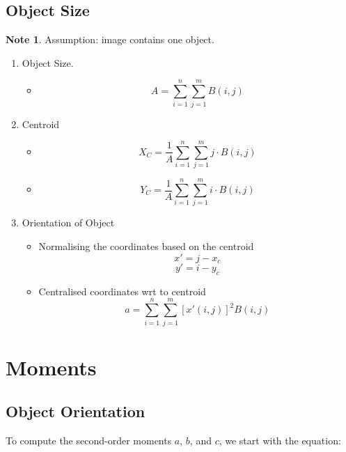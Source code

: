 \documentclass[11pt]{article}
\theoremstyle{definition}
\newtheorem*{unnote}{Note}  %
\begin{document}
\subsection{Object Size}
\begin{unnote}
    Assumption: image contains one object.
\end{unnote}
\begin{enumerate}
    \item Object Size.
    \begin{itemize}
        \item 
        \begin{equation}
        A = \sum_{i=1}^{n} \sum_{j=1}^{m} B(i, j)
        \end{equation}
    \end{itemize}
    \item Centroid
    \begin{itemize}
    \item 
    \begin{equation}
    X_C = \frac{1}{A}\sum_{i=1}^n\sum_{j=1}^m j \cdot B(i,j)
    \end{equation}
    \item 
    \begin{equation}
    Y_C = \frac{1}{A}\sum_{i=1}^n\sum_{j=1}^m i \cdot B(i,j)
    \end{equation}
    \end{itemize}
\item Orientation of Object
\begin{itemize}
    \item Normalising the coordinates based on the centroid
    \[x' =  j -x_c\] 
    \[y' =i-y_c\]
    \item Centralised coordinates wrt to centroid 
    \begin{equation}
    a = \sum_{i=1}^{n} \sum_{j=1}^{m} [x' (i, j)]^2 B(i, j) 
    \end{equation}
\end{itemize}
\end{enumerate}

\section{Moments}
\subsection{Object Orientation}

To compute the second-order moments \( a \), \( b \), and \( c \), we start with the equation:
\end{document}
